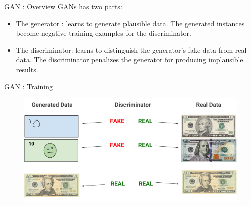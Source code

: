 \documentclass[10pt]{beamer}
\begin{document}
\begin{frame}[fragile]{GAN : Overview}
 GANs has two parts: \\
    \begin{itemize}
        \item The generator : learns to generate plausible data. The generated instances become negative training examples for the discriminator.

        \item The discriminator: learns to distinguish the generator's fake data from real data. The discriminator penalizes the generator for producing implausible results.
    \end{itemize}
\end{frame}


\begin{frame}[fragile]{GAN : Training}
     \begin{figure}[ht]
         \hspace*{-1cm}\includegraphics[width=0.7\linewidth]{gantrain} \\ \\ \\ \\ \\ 


    \end{figure}
\end{frame}
\end{document}
